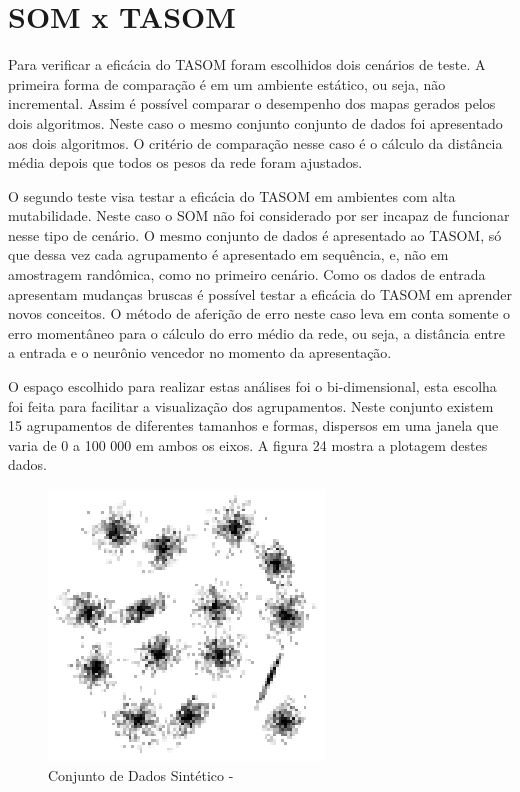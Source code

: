 \chapter{SOM x TASOM}
Para verificar a eficácia do TASOM foram escolhidos dois cenários de teste. A primeira forma de comparação é em um ambiente estático, ou seja, não incremental. Assim é possível comparar o desempenho dos mapas gerados pelos dois algoritmos. Neste caso o mesmo conjunto conjunto de dados foi apresentado aos dois algoritmos. O critério de comparação nesse caso é o cálculo da distância média depois que todos os pesos da rede foram ajustados.

O segundo teste visa testar a eficácia do TASOM em ambientes com alta mutabilidade. Neste caso o SOM não foi considerado por ser incapaz de funcionar nesse tipo de cenário. O mesmo conjunto de dados é apresentado ao TASOM, só que dessa vez cada agrupamento é apresentado em sequência, e, não em amostragem randômica, como no primeiro cenário. Como os dados de entrada apresentam mudanças bruscas é possível testar a eficácia do TASOM em aprender novos conceitos. O método de aferição de erro neste caso leva em conta somente o erro momentâneo para o cálculo do erro médio da rede, ou seja, a distância entre a entrada e o neurônio vencedor no momento da apresentação.

O espaço escolhido para realizar estas análises foi o bi-dimensional, esta escolha foi feita  para facilitar a visualização dos agrupamentos. Neste conjunto existem 15 agrupamentos de diferentes tamanhos e formas, dispersos em uma janela que varia de 0 a 100 000 em ambos os eixos. A figura 24 mostra a plotagem destes dados.

\begin{figure}[!h]
\centering
\includegraphics[keepaspectratio=true,scale=1]
{figuras/birch.eps}
\caption{Conjunto de Dados Sintético - }
\label{data_titatic}
\end{figure}

